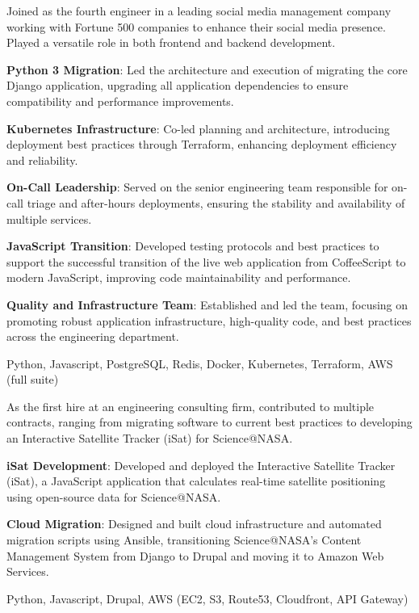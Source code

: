 \documentclass{bluefin_cv}
\begin{document}
{
  Joined as the fourth engineer in a leading social media management company working with Fortune 500 companies to enhance their social media presence.
  Played a versatile role in both frontend and backend development.
}
{
  \item {\bf Python 3 Migration}: Led the architecture and execution of migrating the core Django application, upgrading all application dependencies to ensure compatibility and performance improvements.
  \item {\bf Kubernetes Infrastructure}: Co-led planning and architecture, introducing deployment best practices through Terraform, enhancing deployment efficiency and reliability.
  \item {\bf On-Call Leadership}: Served on the senior engineering team responsible for on-call triage and after-hours deployments, ensuring the stability and availability of multiple services.
  \item {\bf JavaScript Transition}: Developed testing protocols and best practices to support the successful transition of the live web application from CoffeeScript to modern JavaScript, improving code maintainability and performance.
  \item {\bf Quality and Infrastructure Team}: Established and led the team, focusing on promoting robust application infrastructure, high-quality code, and best practices across the engineering department.
}
{
  Python,
  Javascript,
  PostgreSQL,
  Redis,
  Docker,
  Kubernetes,
  Terraform,
  AWS (full suite)
}

{
  As the first hire at an engineering consulting firm, contributed to multiple contracts, ranging from migrating software to current best practices to developing an Interactive Satellite Tracker (iSat) for Science@NASA.
}
{
  \item {\bf iSat Development}: Developed and deployed the Interactive Satellite Tracker (iSat), a JavaScript application that calculates real-time satellite positioning using open-source data for Science@NASA.
  \item {\bf Cloud Migration}: Designed and built cloud infrastructure and automated migration scripts using Ansible, transitioning Science@NASA’s Content Management System from Django to Drupal and moving it to Amazon Web Services.
}
{
  Python,
  Javascript,
  Drupal,
  AWS (EC2, S3, Route53, Cloudfront, API Gateway)
}
\end{document}
